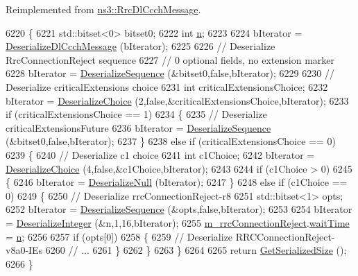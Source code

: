 Reimplemented from \hyperlink{classns3_1_1RrcDlCcchMessage_a302e719efa5b9e43c0a4acd097c65b57}{ns3\+::\+Rrc\+Dl\+Ccch\+Message}.


\begin{DoxyCode}
6220 \{
6221   std::bitset<0> bitset0;
6222   \textcolor{keywordtype}{int} \hyperlink{namespacesample-rng-plot_aeb5ee5c431e338ef39b7ac5431242e1d}{n};
6223 
6224   bIterator = \hyperlink{classns3_1_1RrcDlCcchMessage_a113d0d3c8e4cf337e3bc555c20079aff}{DeserializeDlCcchMessage} (bIterator);
6225 
6226   \textcolor{comment}{// Deserialize RrcConnectionReject sequence}
6227   \textcolor{comment}{// 0 optional fields, no extension marker}
6228   bIterator = \hyperlink{classns3_1_1Asn1Header_a58c68bb97ba3fe2e8fcdd7c208d672b2}{DeserializeSequence} (&bitset0,\textcolor{keyword}{false},bIterator);
6229 
6230   \textcolor{comment}{// Deserialize criticalExtensions choice}
6231   \textcolor{keywordtype}{int} criticalExtensionsChoice;
6232   bIterator = \hyperlink{classns3_1_1Asn1Header_a0af5881f07a0549a8693a1b75c229a90}{DeserializeChoice} (2,\textcolor{keyword}{false},&criticalExtensionsChoice,bIterator);
6233   \textcolor{keywordflow}{if} (criticalExtensionsChoice == 1)
6234     \{
6235       \textcolor{comment}{// Deserialize criticalExtensionsFuture}
6236       bIterator = \hyperlink{classns3_1_1Asn1Header_a58c68bb97ba3fe2e8fcdd7c208d672b2}{DeserializeSequence} (&bitset0,\textcolor{keyword}{false},bIterator);
6237     \}
6238   \textcolor{keywordflow}{else} \textcolor{keywordflow}{if} (criticalExtensionsChoice == 0)
6239     \{
6240       \textcolor{comment}{// Deserialize c1 choice}
6241       \textcolor{keywordtype}{int} c1Choice;
6242       bIterator = \hyperlink{classns3_1_1Asn1Header_a0af5881f07a0549a8693a1b75c229a90}{DeserializeChoice} (4,\textcolor{keyword}{false},&c1Choice,bIterator);
6243 
6244       \textcolor{keywordflow}{if} (c1Choice > 0)
6245         \{
6246           bIterator = \hyperlink{classns3_1_1Asn1Header_a29bd4508f3f1ef636b3480f524fac0ce}{DeserializeNull} (bIterator);
6247         \}
6248       \textcolor{keywordflow}{else} \textcolor{keywordflow}{if} (c1Choice == 0)
6249         \{
6250           \textcolor{comment}{// Deserialize rrcConnectionReject-r8}
6251           std::bitset<1> opts;
6252           bIterator = \hyperlink{classns3_1_1Asn1Header_a58c68bb97ba3fe2e8fcdd7c208d672b2}{DeserializeSequence} (&opts,\textcolor{keyword}{false},bIterator);
6253 
6254           bIterator = \hyperlink{classns3_1_1Asn1Header_a49802c9af30018b078150e866b6ecae2}{DeserializeInteger} (&n,1,16,bIterator);
6255           \hyperlink{classns3_1_1RrcConnectionRejectHeader_aabe4cf962d737cab542008b7ded50fc6}{m\_rrcConnectionReject}.\hyperlink{structns3_1_1LteRrcSap_1_1RrcConnectionReject_a2a7999c9f68b395cf5dc44a35270a2b5}{waitTime} = \hyperlink{namespacesample-rng-plot_aeb5ee5c431e338ef39b7ac5431242e1d}{n};
6256 
6257           \textcolor{keywordflow}{if} (opts[0])
6258             \{
6259               \textcolor{comment}{// Deserialize RRCConnectionReject-v8a0-IEs}
6260               \textcolor{comment}{// ...}
6261             \}
6262         \}
6263     \}
6264 
6265   \textcolor{keywordflow}{return} \hyperlink{classns3_1_1Asn1Header_a18a67eb7869c5784f59d197bbd76a74f}{GetSerializedSize} ();
6266 \}
\end{DoxyCode}


